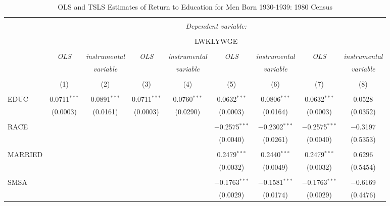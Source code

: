 \documentclass{article}
\begin{document}
\begin{sidewaystable}[!htbp] \centering 
  \caption{OLS and TSLS Estimates of Return to Education for Men Born 
    1930-1939: 1980 Census} 
  \label{} 
\begin{tabular}{@{\extracolsep{5pt}}lcccccccc} 
\\[-1.8ex]\hline 
\hline \\[-1.8ex] 
 & \multicolumn{8}{c}{\textit{Dependent variable:}} \\ 
\cline{2-9} 
\\[-1.8ex] & \multicolumn{8}{c}{LWKLYWGE} \\ 
\\[-1.8ex] & \textit{OLS} & \textit{instrumental} & \textit{OLS} & \textit{instrumental} & \textit{OLS} & \textit{instrumental} & \textit{OLS} & \textit{instrumental} \\ 
 & \textit{} & \textit{variable} & \textit{} & \textit{variable} & \textit{} & \textit{variable} & \textit{} & \textit{variable} \\ 
\\[-1.8ex] & (1) & (2) & (3) & (4) & (5) & (6) & (7) & (8)\\ 
\hline \\[-1.8ex] 
 EDUC & 0.0711$^{***}$ & 0.0891$^{***}$ & 0.0711$^{***}$ & 0.0760$^{***}$ & 0.0632$^{***}$ & 0.0806$^{***}$ & 0.0632$^{***}$ & 0.0528 \\ 
  & (0.0003) & (0.0161) & (0.0003) & (0.0290) & (0.0003) & (0.0164) & (0.0003) & (0.0352) \\ 
  & & & & & & & & \\ 
 RACE &  &  &  &  & $-$0.2575$^{***}$ & $-$0.2302$^{***}$ & $-$0.2575$^{***}$ & $-$0.3197 \\ 
  &  &  &  &  & (0.0040) & (0.0261) & (0.0040) & (0.5353) \\ 
  & & & & & & & & \\ 
 MARRIED &  &  &  &  & 0.2479$^{***}$ & 0.2440$^{***}$ & 0.2479$^{***}$ & 0.6296 \\ 
  &  &  &  &  & (0.0032) & (0.0049) & (0.0032) & (0.5454) \\ 
  & & & & & & & & \\ 
 SMSA &  &  &  &  & $-$0.1763$^{***}$ & $-$0.1581$^{***}$ & $-$0.1763$^{***}$ & $-$0.6169 \\ 
  &  &  &  &  & (0.0029) & (0.0174) & (0.0029) & (0.4476) \\ 

\end{tabular}
\end{sidewaystable}
\end{document}
